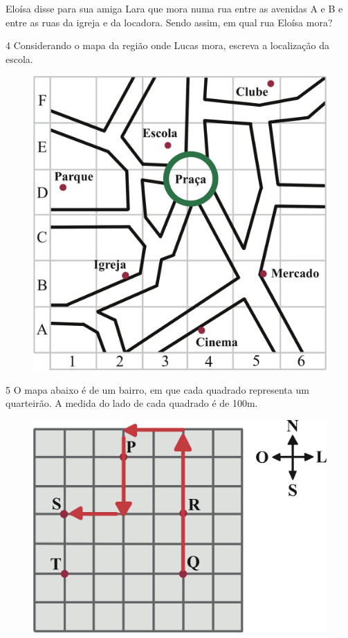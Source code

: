 Eloísa disse para sua amiga Lara que mora numa rua entre as avenidas A e
B e entre as ruas da igreja e da locadora. Sendo assim, em qual rua Eloísa
mora?


\pagebreak
\num{4} Considerando o mapa da região onde Lucas mora, escreva a localização
da escola.

\begin{figure}[htpb!]
\centering
\includegraphics[width=\textwidth]{./ilustras-mat/modulo_12-atividade_4.png}
\end{figure}


\pagebreak
\num{5} O mapa abaixo é de um bairro, em que cada quadrado representa um
quarteirão. A medida do lado de cada quadrado é de 100m.

\begin{figure}[htpb!]
\centering
\includegraphics[width=.8\textwidth]{./ilustras-mat/modulo_12-atividade_5_resposta.png}
\end{figure}


